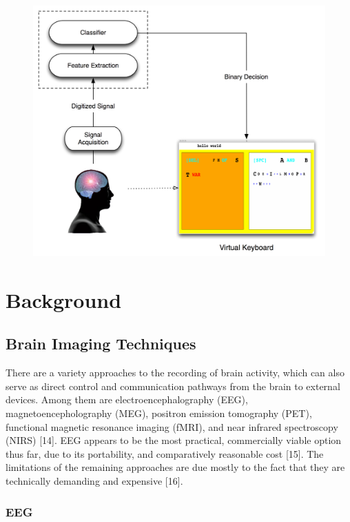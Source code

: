 \documentclass[12pt,titlepage]{article}
\begin{document}
\begin{figure}[t]
\begin{center}
	\includegraphics[scale=0.40]{Figure1.jpg}
	\label{fig:BCI}
\end{center}
\end{figure}

\section{Background}

\subsection{Brain Imaging Techniques}

There are a variety approaches to the recording of brain activity, which can also serve as direct control 
and communication pathways from the brain to external devices.  Among them are 
electroencephalography (EEG), magnetoencepholography (MEG), positron emission tomography 
(PET), functional magnetic resonance imaging (fMRI), and near infrared spectroscopy (NIRS) [14].  EEG 
appears to be the most practical, commercially viable option thus far, due to its portability, and 
comparatively reasonable cost [15].  The limitations of the remaining approaches are due mostly to the fact 
that they are technically demanding and expensive [16].

\subsubsection{EEG}
\end{document}
